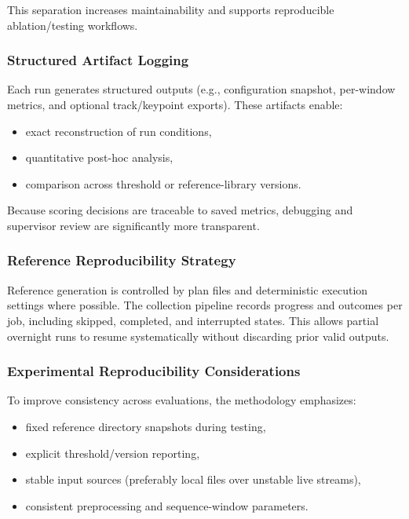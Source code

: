 \documentclass[12pt]{article}
\begin{document}
{This separation increases maintainability and supports reproducible ablation/testing workflows.

\subsubsection{Structured Artifact Logging}

Each run generates structured outputs (e.g., configuration snapshot, per-window metrics, and optional track/keypoint exports). These artifacts enable:

\begin{itemize}
    \item exact reconstruction of run conditions,
    \item quantitative post-hoc analysis,
    \item comparison across threshold or reference-library versions.
\end{itemize}

Because scoring decisions are traceable to saved metrics, debugging and supervisor review are significantly more transparent.

\subsubsection{Reference Reproducibility Strategy}

Reference generation is controlled by plan files and deterministic execution settings where possible. The collection pipeline records progress and outcomes per job, including skipped, completed, and interrupted states. This allows partial overnight runs to resume systematically without discarding prior valid outputs.

\subsubsection{Experimental Reproducibility Considerations}

To improve consistency across evaluations, the methodology emphasizes:

\begin{itemize}
    \item fixed reference directory snapshots during testing,
    \item explicit threshold/version reporting,
    \item stable input sources (preferably local files over unstable live streams),
    \item consistent preprocessing and sequence-window parameters.
\end{itemize}

}
\end{document}
